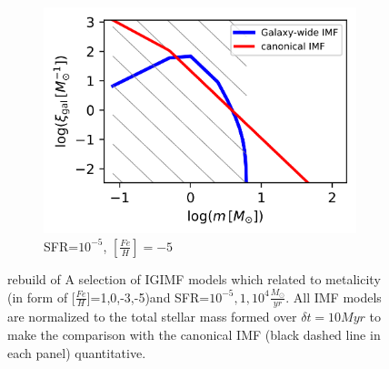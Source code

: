 \begin{figure}
	\begin{subfigure}[b]{0.45\textwidth}
		\includegraphics[width=\textwidth]{sfr1e-5-feh-5.png}
		\caption{SFR=$10^{-5}$, $[\frac{Fe}{H}]=-5$}
		\label{fig:2d-5dt}
	\end{subfigure}
	\caption{rebuild of A selection of IGIMF models which related to metalicity (in form of $[\frac{Fe}{H}$]=1,0,-3,-5)and SFR=$10^{-5},1,10^{4} \frac{M_{\odot}}{yr}$. All IMF models are
		normalized to the total stellar mass formed over $\delta t = 10 Myr$ to make the comparison with the canonical IMF (black dashed line in each panel)
		quantitative.}
	\label{fig:feh-5}
\end{figure}
